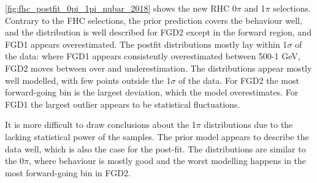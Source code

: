 \autoref{fig:fhc_postfit_0pi_1pi_nubar_2018} shows the new RHC 0$\pi$ and 1$\pi$ selections. Contrary to the FHC selections, the prior prediction covers the \pmu behaviour well, and the \cosmu distribution is well described for FGD2 except in the forward region, and FGD1 appears overestimated. The postfit distributions mostly lay within 1$\sigma$ of the data: where FGD1 appears consistently overestimated between 500-1 GeV, FGD2 moves between over and underestimation. The \cosmu distributions appear mostly well modelled, with few points outside the 1$\sigma$ of the data. For FGD2 the most forward-going bin is the largest deviation, which the model overestimates. For FGD1 the largest outlier appears to be statistical fluctuations.

It is more difficult to draw conclusions about the 1$\pi$ distributions due to the lacking statistical power of the samples. The prior model appears to describe the data well, which is also the case for the post-fit. The \cosmu distributions are similar to the 0$\pi$, where behaviour is mostly good and the worst modelling happens in the most forward-going bin in FGD2.
